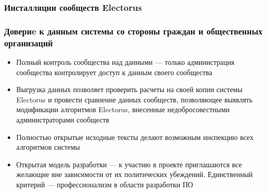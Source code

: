 \documentclass[compress,hyperref={linkcolor=blue,pdftex,unicode}]{beamer}
\begin{document}
\begin{frame}
\frametitle{Инсталляции сообществ Electorus}
\begin{center}
\end{center}
\end{frame}

\begin{frame}
\frametitle{Довериe к данным системы со стороны граждан и общественных организаций}
\begin{itemize}
\item \alert{Полный контроль сообщества над данными} --- только администрация сообщества контролирует доступ к данным своего сообщества
\item \alert{Выгрузка данных} позволяет проверить расчеты на своей копии системы Electorus и провести \alert{сравнение данных сообществ,} позволяющее выявлять модификации алгоритмов Electorus, внесенные недобросовестными администраторами сообществ
\item \alert{Полностью открытые исходные тексты} делают возможным инспекцию всех алгоритмов системы
\item \alert{Открытая модель разработки} --- к участию в проекте приглашаются все желающие вне зависимости от их политических убеждений. Единственный критерий --- профессионализм в области разработки ПО
\end{itemize}
\end{frame}

\end{document}
